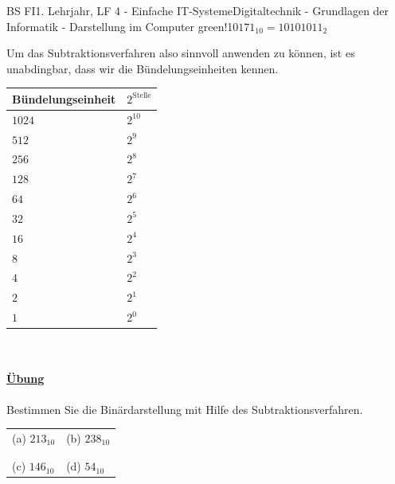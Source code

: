\documentclass[11pt,twocolumn,oneside,openany,headings=optiontotoc,11pt,numbers=noenddot]{article}
\begin{document}
\begin{worksheet}{BS FI}{1. Lehrjahr, LF 4 - Einfache IT-Systeme}{Digitaltechnik - Grundlagen der Informatik - Darstellung im Computer}
{		green!10}{\(171_{10} = 10101011_{2}\)}\\
		\par\noindent
		Um das Subtraktionsverfahren also sinnvoll anwenden zu können, ist es unabdingbar, dass wir die Bündelungseinheiten kennen.\\
		\par\noindent
		\begin{tabularx}{0.45\textwidth}{M|M}
			\textbf{Bündelungseinheit} & \textbf{\(2^{\text{Stelle}}\)}\\
			\hline
			\(1024\) & \(2^{10}\)\\
			\hline
			\(512\) & \(2^{9}\)\\
			\hline
			\(256\) & \(2^{8}\)\\
			\hline
			\(128\) & \(2^{7}\)\\
			\hline
			\(64\) & \(2^{6}\)\\
			\hline
			\(32\) & \(2^{5}\)\\
			\hline
			\(16\) & \(2^{4}\)\\
			\hline
			\(8\) & \(2^{3}\)\\
			\hline
			\(4\) & \(2^{2}\)\\
			\hline
			\(2\) & \(2^{1}\)\\
			\hline
			\(1\) & \(2^{0}\)
		\end{tabularx}\\
		\par\noindent
		\paragraph{\underline{Übung}} Bestimmen Sie die Binärdarstellung mit Hilfe des Subtraktionsverfahren.\\
		\begin{tabularx}{0.45\textwidth}{M|M}
			(a) \(213_{10}\) & (b) \(238_{10}\)\\
			& \\
			\hline
			& \\
			(c) \(146_{10}\) & (d) \(54_{10}\)\\
		\end{tabularx}
	 	\newpage

\end{worksheet}
\end{document}
